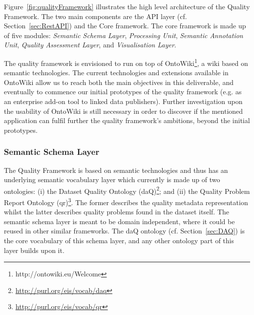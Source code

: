 Figure~\ref{fig:qualityFramework} illustrates the high level architecture of the Quality Framework.
The two main components are the API layer (cf. Section~\ref{sec:RestAPI}) and the Core framework.
The core framework is made up of five modules: \emph{Semantic Schema Layer}, \emph{Processing Unit}, \emph{Semantic Annotation Unit}, \emph{Quality Assessment Layer}, and \emph{Visualisation Layer}.

The quality framework is envisioned to run on top of OntoWiki\footnote{http://ontowiki.eu/Welcome}, a wiki based on semantic technologies.
The current technologies and extensions available in OntoWiki allow us to reach both the main objectives in this deliverable, and eventually to commence our initial prototypes of the quality framework (e.g. as an enterprise add-on tool to linked data publishers).
Further investigation upon the usability of OntoWiki is still necessary in order to discover if the mentioned application can fulfil further the quality framework's ambitions, beyond the initial prototypes.

\subsubsection{Semantic Schema Layer}
The Quality Framework is based on semantic technologies and thus has an underlying semantic vocabulary layer which currently is made up of two ontologies: (i) the Dataset Quality Ontology (daQ)\footnote{\url{http://purl.org/eis/vocab/daq}}; and (ii) the Quality Problem Report Ontology (qr)\footnote{\url{http://purl.org/eis/vocab/qr}}. 
The former describes the quality metadata representation whilst the latter describes quality problems found in the dataset itself. 
The semantic schema layer is meant to be domain independent, where it could be reused in other similar frameworks. 
The daQ ontology (cf. Section~\ref{sec:DAQ}) is the core vocabulary of this schema layer, and any other ontology part of this layer builds upon it.

